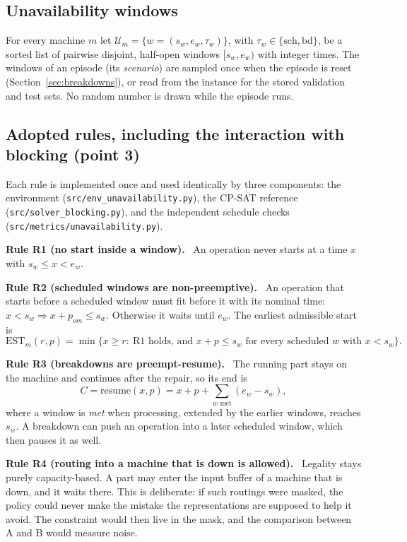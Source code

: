 \documentclass[11pt,a4paper]{article}
\newenvironment{adopted}[1]{%
  \par\medskip\noindent\textbf{\color{rule}Rule #1.}\ }{\par\medskip}
\newcommand{\Uset}{\mathcal{U}}
\newcommand{\sch}{\mathrm{sch}}
\newcommand{\bd}{\mathrm{bd}}
\newcommand{\EST}{\mathrm{EST}}
\newcommand{\code}[1]{\texttt{#1}}
\begin{document}
\subsection{Unavailability windows}

For every machine $m$ let $\Uset_m=\{w=(s_w,e_w,\tau_w)\}$, with $\tau_w\in\{\sch,\bd\}$, be a
sorted list of pairwise disjoint, half-open windows $[s_w,e_w)$ with integer times. The windows
of an episode (its \emph{scenario}) are sampled once when the episode is reset
(Section~\ref{sec:breakdowns}), or read from the instance for the stored validation and test
sets. No random number is drawn while the episode runs.

\subsection{Adopted rules, including the interaction with blocking (point 3)}
\label{sec:rules}

Each rule is implemented once and used identically by three components: the environment
(\code{src/env\_unavailability.py}), the CP-SAT reference (\code{src/solver\_blocking.py}), and
the independent schedule checks (\code{src/metrics/unavailability.py}).

\begin{adopted}{R1 (no start inside a window)}
An operation never starts at a time $x$ with $s_w\le x<e_w$.
\end{adopted}

\begin{adopted}{R2 (scheduled windows are non-preemptive)}
An operation that starts before a scheduled window must fit before it with its nominal time:
$x<s_w \Rightarrow x+p_{om}\le s_w$. Otherwise it waits until $e_w$. The earliest admissible
start is
\[
  \EST_m(r,p)=\min\{x\ge r:\ \text{R1 holds, and } x+p\le s_w \text{ for every scheduled } w
  \text{ with } x<s_w\}.
\]
\end{adopted}

\begin{adopted}{R3 (breakdowns are preempt-resume)}
The running part stays on the machine and continues after the repair, so its end is
\[
  C=\mathrm{resume}(x,p)=x+p+\sum_{w\text{ met}}(e_w-s_w),
\]
where a window is \emph{met} when processing, extended by the earlier windows, reaches $s_w$.
A breakdown can push an operation into a later scheduled window, which then pauses it as well.
\end{adopted}

\begin{adopted}{R4 (routing into a machine that is down is allowed)}
Legality stays purely capacity-based. A part may enter the input buffer of a machine that is
down, and it waits there. This is deliberate: if such routings were masked, the policy could
never make the mistake the representations are supposed to help it avoid. The constraint
would then live in the mask, and the comparison between A and B would measure noise.
\end{adopted}
\end{document}
